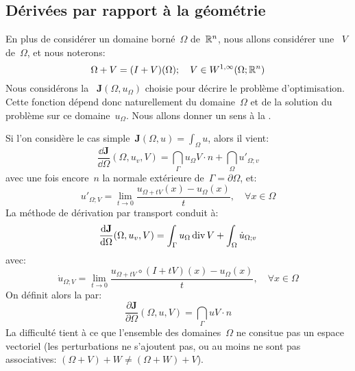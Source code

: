 \subsection{Dérivées par rapport à la géométrie}
En plus de considérer un domaine borné~$\Omega$ de~$\mathbb R^n$, nous allons considérer
une ~$V$ de~$\Omega$, et nous noterons:
\begin{equation} \Omega + V = (I+V)(\Omega);\quad V\in W^{1,\infty}(\Omega;\mathbb R^n) \end{equation}
\medskipvm
Nous considérons la ~${\mathbf J}(\Omega, u_\Omega)$ choisie
pour décrire le problème d'optimisation. Cette fonction dépend donc naturellement
du domaine~$\Omega$ et de la solution du problème sur ce domaine~$u_\Omega$.
Nous allons donner un sens à la .

\medskip
Si l'on considère le cas simple~${\mathbf J}(\Omega,u)=\int_\Omega u$, alors il vient:
\begin{equation}
\dfrac{\dd{\mathbf J}}{\dd\Omega}(\Omega, u_v,V)=\dint_\Gamma u_\Omega V\cdot n + \dint_\Omega u'_{\Omega;v}
\end{equation}
avec une fois encore~$n$ la normale extérieure de~$\Gamma=\partial\Omega$, et:
\begin{equation}
u'_{\Omega;V}=\lim_{t\rightarrow0} \dfrac{u_{\Omega+tV}(x)-u_\Omega(x)}t, \quad\forall x\in\Omega
\end{equation}
La méthode de dérivation par transport conduit à:
\begin{equation}
\dfrac{\text{d}{\mathbf J}}{\text{d}\Omega}(\Omega, u_v,V)=\displaystyle\int_\Gamma u_\Omega \operatorname{div} V + \displaystyle\int_\Omega \dot{u}_{\Omega;v}
\end{equation}
avec:
\begin{equation}
\dot{u}_{\Omega;V}=\lim_{t\rightarrow0} \dfrac{u_{\Omega+tV}\circ (I+tV)(x)-u_\Omega(x)}t,\quad \forall x\in\Omega
\end{equation}
On définit alors la 
par:
\begin{equation}
\dfrac{\partial{\mathbf J}}{\partial\Omega}(\Omega, u,V) = \dint_\Gamma u V\cdot n
\end{equation}
La difficulté tient à ce que l'ensemble des domaines~$\Omega$ ne consitue pas un espace vectoriel
(les perturbations ne s'ajoutent pas, ou au moins ne sont pas associatives:
$(\Omega+V)+W\ne(\Omega+W)+V$).

